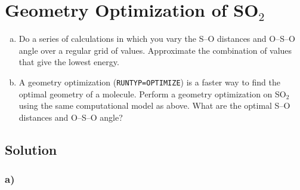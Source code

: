 \documentclass[11pt]{article}
\begin{document}
\section{Geometry Optimization of SO$_{\text{2}}$}
\label{sec-3}

\begin{enumerate}[(a)]
\item Do a series of calculations in which you vary the S–O distances and O–S–O angle over a regular grid of values. Approximate the combination of values that give the lowest energy.

\item A geometry optimization (\verb~RUNTYP=OPTIMIZE~) is a faster way to find the optimal geometry of a molecule. Perform a geometry optimization on SO$_{\text{2}}$ using the same computational model as above. What are the optimal S–O distances and O–S–O angle?
\end{enumerate}

\subsection{Solution}
\label{sec-3-1}

\subsubsection{a)}
\label{sec-3-1-1}
\end{document}
